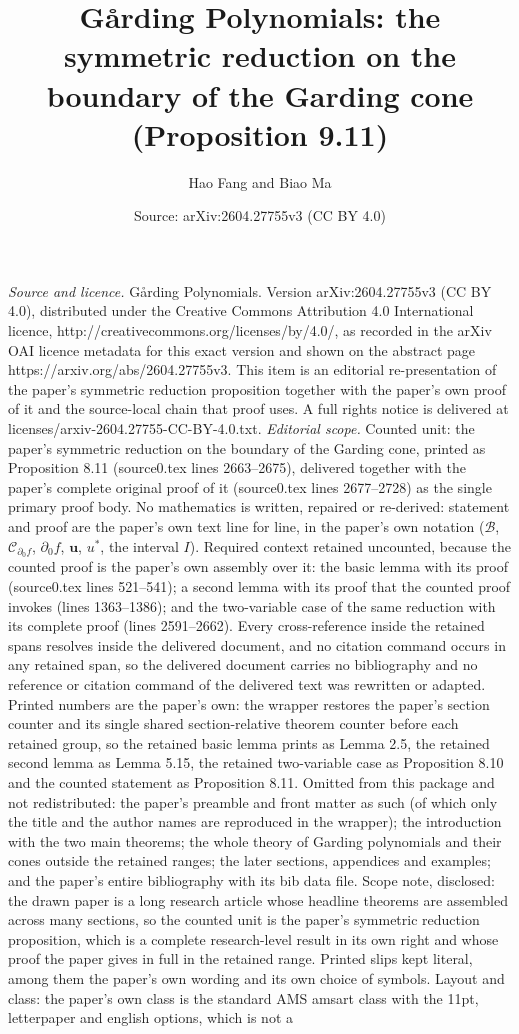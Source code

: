 \documentclass[10pt,a4paper]{amsart}
\title[Garding polynomials]{G{\aa}rding Polynomials: the symmetric reduction on the boundary of the Garding cone (Proposition 9.11)}
\author[Hao Fang and Biao Ma]{Hao Fang and Biao Ma}
\date{Source: arXiv:2604.27755v3 (CC BY 4.0)}
\numberwithin{equation}{section}
\numberwithin{figure}{section}
\theoremstyle{plain}
\theoremstyle{remark}
\theoremstyle{definition}
\theoremstyle{plain}
\theoremstyle{definition}
\theoremstyle{plain}
\theoremstyle{plain}
\theoremstyle{plain}
\def\u{\mathbf{u}}
\begin{document}
\maketitle
\vspace{1em}
\noindent\textit{Source and licence.} G{\aa}rding Polynomials. Version arXiv:2604.27755v3 (CC BY 4.0), distributed under the Creative Commons Attribution 4.0 International licence, http://creativecommons.org/licenses/by/4.0/, as recorded in the arXiv OAI licence metadata for this exact version and shown on the abstract page https://arxiv.org/abs/2604.27755v3. This item is an editorial re-presentation of the paper's symmetric reduction proposition together with the paper's own proof of it and the source-local chain that proof uses. A full rights notice is delivered at licenses/arxiv-2604.27755-CC-BY-4.0.txt.
\noindent\textit{Editorial scope.} Counted unit: the paper's symmetric reduction on the boundary of the Garding cone, printed as Proposition 8.11 (source0.tex lines 2663--2675), delivered together with the paper's complete original proof of it (source0.tex lines 2677--2728) as the single primary proof body. No mathematics is written, repaired or re-derived: statement and proof are the paper's own text line for line, in the paper's own notation ($\mathcal{B}$, $\mathcal{C}_{\partial_{0}f}$, $\partial_{0}f$, $\u$, $u^{*}$, the interval $I$). Required context retained uncounted, because the counted proof is the paper's own assembly over it: the basic lemma with its proof (source0.tex lines 521--541); a second lemma with its proof that the counted proof invokes (lines 1363--1386); and the two-variable case of the same reduction with its complete proof (lines 2591--2662). Every cross-reference inside the retained spans resolves inside the delivered document, and no citation command occurs in any retained span, so the delivered document carries no bibliography and no reference or citation command of the delivered text was rewritten or adapted. Printed numbers are the paper's own: the wrapper restores the paper's section counter and its single shared section-relative theorem counter before each retained group, so the retained basic lemma prints as Lemma 2.5, the retained second lemma as Lemma 5.15, the retained two-variable case as Proposition 8.10 and the counted statement as Proposition 8.11. Omitted from this package and not redistributed: the paper's preamble and front matter as such (of which only the title and the author names are reproduced in the wrapper); the introduction with the two main theorems; the whole theory of Garding polynomials and their cones outside the retained ranges; the later sections, appendices and examples; and the paper's entire bibliography with its bib data file. Scope note, disclosed: the drawn paper is a long research article whose headline theorems are assembled across many sections, so the counted unit is the paper's symmetric reduction proposition, which is a complete research-level result in its own right and whose proof the paper gives in full in the retained range. Printed slips kept literal, among them the paper's own wording and its own choice of symbols. Layout and class: the paper's own class is the standard AMS amsart class with the 11pt, letterpaper and english options, which is not a 
\end{document}
